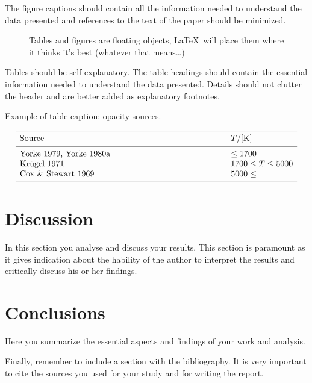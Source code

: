 \documentclass[a4paper,10pt]{article}
\begin{document}
The figure captions should contain all the information needed to
understand the data presented and references to the text of the paper
should be minimized.


\begin{figure}[htb]
   \centering
   \caption{Tables and figures are floating objects, \LaTeX\, will place them
      where it thinks it's best (whatever that means\ldots)
   }
   \label{FigVibStab}
\end{figure}

Tables should be self-explanatory. The table headings should contain
the essential information needed to understand the data presented.
Details should not clutter the header and are better added as explanatory
footnotes.

\begin{table}[htb]
   \caption[]{Example of table caption: opacity sources.}
   \label{KapSou}
   $$
      \begin{array}{p{0.7\linewidth}l}
         \hline
         \noalign{\smallskip}
         Source                  & T / {[\mathrm{K}]}    \\
         \noalign{\smallskip}
         \hline
         \noalign{\smallskip}
         Yorke 1979, Yorke 1980a & \leq 1700             \\
         Kr\"ugel 1971           & 1700 \leq T \leq 5000 \\
         Cox \& Stewart 1969     & 5000 \leq             \\
         \noalign{\smallskip}
         \hline
      \end{array}
   $$
\end{table}

\section{Discussion}
In this section you analyse and discuss your results.
This section is paramount as it gives indication about the
hability of the author to interpret the results and
critically discuss his or her findings.

\section{Conclusions}
Here you summarize the essential aspects and findings
of your work and analysis.

Finally, remember to include a section with the bibliography.
It is very important to cite the sources you used for your study and
for writing the report.


\printbibliography
\end{document}
